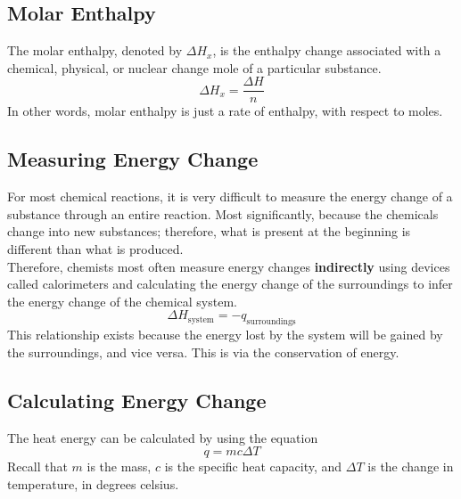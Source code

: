 \subsection{Molar Enthalpy}
The molar enthalpy, denoted by $\Delta H_x$, is the enthalpy change associated with a chemical,
physical, or nuclear change mole of a particular substance.
\[
    \Delta H_x=\frac{\Delta H}{n}
\]
In other words, molar enthalpy is just a rate of enthalpy, with respect to moles.

\subsection{Measuring Energy Change}
For most chemical reactions, it is very difficult to measure the energy change of a substance
through an entire reaction. Most significantly, because the chemicals change into new substances;
therefore, what is present at the beginning is different than what is produced.\\

Therefore, chemists most often measure energy changes \textbf{indirectly} using devices called
calorimeters and calculating the energy change of the surroundings to infer the energy change of
the chemical system.
\[
    \Delta H_\text{system}=-q_\text{surroundings}
\]
This relationship exists because the energy lost by the system will be gained by the surroundings,
and vice versa. This is via the conservation of energy.

\subsection{Calculating Energy Change}
The heat energy can be calculated by using the equation
\[
    q=mc\Delta T
\]
Recall that $m$ is the mass, $c$ is the specific heat capacity, and $\Delta T$ is the change in
temperature, in degrees celsius.

